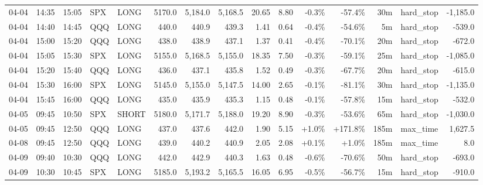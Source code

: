\documentclass[11pt,a4paper,twoside]{article}
\begin{document}
\begin{landscape}
\begin{center}
\begin{longtable}{>{\color{txtmain}}l l l l l r r r r r r r r >{\color{txtmain}}l r}
04-04 & 14:35 & 15:05 & SPX & LONG & 5170.0 & 5,184.0 & 5,168.5 & 20.65 & 8.80 & \textcolor{lossred}{-0.3\%} & \textcolor{lossred}{-57.4\%} & 30m & hard\_stop & \textcolor{lossred}{-1,185.0} \\
04-04 & 14:40 & 14:45 & QQQ & LONG & 440.0 & 440.9 & 439.3 & 1.41 & 0.64 & \textcolor{lossred}{-0.4\%} & \textcolor{lossred}{-54.6\%} & 5m & hard\_stop & \textcolor{lossred}{-539.0} \\
04-04 & 15:00 & 15:20 & QQQ & LONG & 438.0 & 438.9 & 437.1 & 1.37 & 0.41 & \textcolor{lossred}{-0.4\%} & \textcolor{lossred}{-70.1\%} & 20m & hard\_stop & \textcolor{lossred}{-672.0} \\
04-04 & 15:05 & 15:30 & SPX & LONG & 5155.0 & 5,168.5 & 5,155.0 & 18.35 & 7.50 & \textcolor{lossred}{-0.3\%} & \textcolor{lossred}{-59.1\%} & 25m & hard\_stop & \textcolor{lossred}{-1,085.0} \\
04-04 & 15:20 & 15:40 & QQQ & LONG & 436.0 & 437.1 & 435.8 & 1.52 & 0.49 & \textcolor{lossred}{-0.3\%} & \textcolor{lossred}{-67.7\%} & 20m & hard\_stop & \textcolor{lossred}{-615.0} \\
04-04 & 15:30 & 16:00 & SPX & LONG & 5145.0 & 5,155.0 & 5,147.5 & 14.00 & 2.65 & \textcolor{lossred}{-0.1\%} & \textcolor{lossred}{-81.1\%} & 30m & hard\_stop & \textcolor{lossred}{-1,135.0} \\
04-04 & 15:45 & 16:00 & QQQ & LONG & 435.0 & 435.9 & 435.3 & 1.15 & 0.48 & \textcolor{lossred}{-0.1\%} & \textcolor{lossred}{-57.8\%} & 15m & hard\_stop & \textcolor{lossred}{-532.0} \\
04-05 & 09:45 & 10:50 & SPX & SHORT & 5180.0 & 5,171.7 & 5,188.0 & 19.20 & 8.90 & \textcolor{lossred}{-0.3\%} & \textcolor{lossred}{-53.6\%} & 65m & hard\_stop & \textcolor{lossred}{-1,030.0} \\
04-05 & 09:45 & 12:50 & QQQ & LONG & 437.0 & 437.6 & 442.0 & 1.90 & 5.15 & \textcolor{wingreen}{+1.0\%} & \textcolor{wingreen}{+171.8\%} & 185m & max\_time & \textcolor{wingreen}{1,627.5} \\
04-08 & 09:45 & 12:50 & QQQ & LONG & 439.0 & 440.2 & 440.9 & 2.05 & 2.08 & \textcolor{wingreen}{+0.1\%} & \textcolor{wingreen}{+1.0\%} & 185m & max\_time & \textcolor{wingreen}{8.0} \\
04-09 & 09:40 & 10:30 & QQQ & LONG & 442.0 & 442.9 & 440.3 & 1.63 & 0.48 & \textcolor{lossred}{-0.6\%} & \textcolor{lossred}{-70.6\%} & 50m & hard\_stop & \textcolor{lossred}{-693.0} \\
04-09 & 10:30 & 10:45 & SPX & LONG & 5185.0 & 5,193.2 & 5,165.5 & 16.05 & 6.95 & \textcolor{lossred}{-0.5\%} & \textcolor{lossred}{-56.7\%} & 15m & hard\_stop & \textcolor{lossred}{-910.0} \\

\end{longtable}
\end{center}
\end{landscape}
\end{document}
